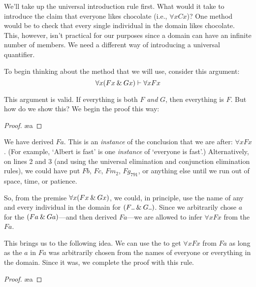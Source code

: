 We'll take up the universal introduction rule first. What would it take to introduce the claim that everyone likes chocolate (i.e., $\forall x Cx$)? One method would be to check that every single individual in the domain likes chocolate. This, however, isn’t practical for our purposes since a domain can have an infinite number of members.
We need a different way of introducing a universal quantifier.

To begin thinking about the method that we will use, consider this argument:
$$\forall x (Fx \mathbin{\&} Gx) \vdash \forall x Fx$$

\noindent This argument is valid. If everything is both $F$ \emph{and} $G$, then everything is $F$.  But how do we show this?  We begin the proof this way:

\begin{proof}
	 \pr{}
	 
	 \ae{a}
\end{proof}
We have derived $Fa$. This is an \textit{instance} of the conclusion that we are after: $\forall xFx$. (For example, `Albert is fast' is one \textit{instance} of `everyone is fast'.) 
Alternatively, on lines 2 and 3 (and using the universal elimination and conjunction elimination rules), we could have put $Fb$, $Fc$, $Fm_2$, $Fg_{791}$, or anything else until we run out of space, time, or patience.   

So, from the premise $\forall x (Fx \mathbin{\&} Gx)$, we could, in principle, use the name of any and every individual in the domain for $(F\rule{1.7mm}{0.15mm} \eand G\rule{1.7mm}{0.15mm})$.
Since we arbitrarily chose $a$ for the $(Fa \mathbin{\&} Ga)$---and then derived $Fa$---we are allowed to infer $\forall x Fx$ from the $Fa$.  

This brings us to the following idea. We can use the  to get $\forall x Fx$ from $Fa$ as long as the $a$ in $Fa$ was arbitrarily chosen from the names of everyone or everything in the domain. Since it was, we complete the proof with this rule.

\begin{proof}
	 \pr{}
	 
	 \ae{a}
	 
\end{proof}

